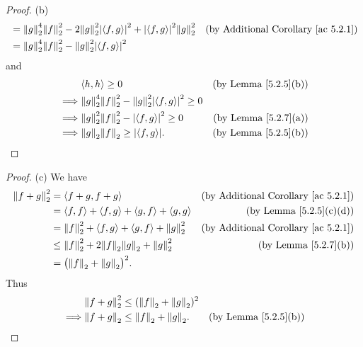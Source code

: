 \begin{proof}{(b)}
\begin{align*}
         & = \norm*{g}_2^4 \norm*{f}_2^2 - 2 \norm*{g}_2^2 \abs{\inner*{f, g}}^2 + \abs{\inner*{f, g}}^2 \norm*{g}_2^2              & \text{(by Additional Corollary \ref{ac 5.2.1})} \\
         & = \norm*{g}_2^4 \norm*{f}_2^2 - \norm*{g}_2^2 \abs{\inner*{f, g}}^2
    \end{align*}
    and
    \begin{align*}
                 & \inner*{h, h} \geq 0                                                     & \text{(by Lemma \ref{5.2.5}(b))} \\
        \implies & \norm*{g}_2^4 \norm*{f}_2^2 - \norm*{g}_2^2 \abs{\inner*{f, g}}^2 \geq 0                                    \\
        \implies & \norm*{g}_2^2 \norm*{f}_2^2 - \abs{\inner*{f, g}}^2 \geq 0               & \text{(by Lemma \ref{5.2.7}(a))} \\
        \implies & \norm*{g}_2 \norm*{f}_2 \geq \abs{\inner*{f, g}}.                        & \text{(by Lemma \ref{5.2.5}(b))}
    \end{align*}
\end{proof}

\begin{proof}{(c)}
    We have
    \begin{align*}
        \norm*{f + g}_2^2 & = \inner*{f + g, f + g}                                         & \text{(by Additional Corollary \ref{ac 5.2.1})} \\
                          & = \inner*{f, f} + \inner*{f, g} + \inner*{g, f} + \inner*{g, g} & \text{(by Lemma \ref{5.2.5}(c)(d))}             \\
                          & = \norm*{f}_2^2 + \inner*{f, g} + \inner*{g, f} + \norm*{g}_2^2 & \text{(by Additional Corollary \ref{ac 5.2.1})} \\
                          & \leq \norm*{f}_2^2 + 2 \norm*{f}_2 \norm*{g}_2 + \norm*{g}_2^2  & \text{(by Lemma \ref{5.2.7}(b))}                \\
                          & = \big(\norm*{f}_2 + \norm*{g}_2\big)^2.
    \end{align*}
    Thus
    \begin{align*}
                 & \norm*{f + g}_2^2 \leq (\norm*{f}_2 + \norm*{g}_2)^2                                    \\
        \implies & \norm*{f + g}_2 \leq \norm*{f}_2 + \norm*{g}_2.      & \text{(by Lemma \ref{5.2.5}(b))}
    \end{align*}
\end{proof}

